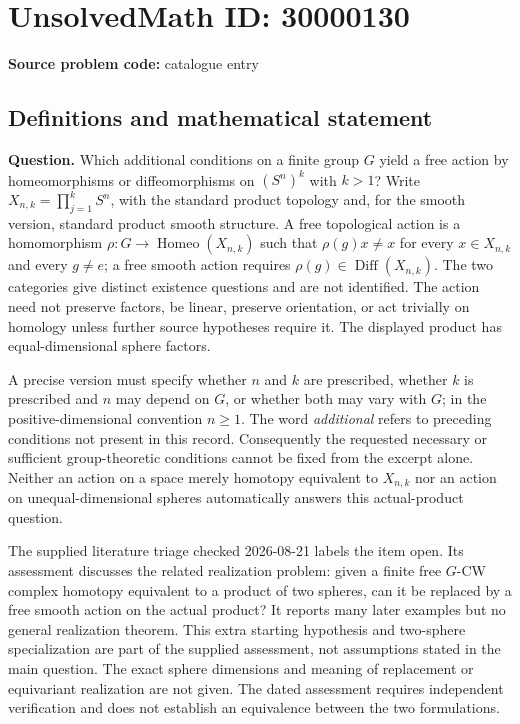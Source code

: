 \documentclass[11pt]{article}
\begin{document}
\section*{UnsolvedMath ID: 30000130}
\textbf{Source problem code:} catalogue entry
\subsection{Definitions and mathematical statement}
\textbf{Question.} Which additional conditions on a finite group \(G\) yield a free action by homeomorphisms or diffeomorphisms on \((S^n)^k\) with \(k>1\)? Write \(X_{n,k}=\prod_{j=1}^k S^n\), with the standard product topology and, for the smooth version, standard product smooth structure. A free topological action is a homomorphism \(\rho:G\to\operatorname{Homeo}(X_{n,k})\) such that \(\rho(g)x\ne x\) for every \(x\in X_{n,k}\) and every \(g\ne e\); a free smooth action requires \(\rho(g)\in\operatorname{Diff}(X_{n,k})\). The two categories give distinct existence questions and are not identified. The action need not preserve factors, be linear, preserve orientation, or act trivially on homology unless further source hypotheses require it. The displayed product has equal-dimensional sphere factors.\par A precise version must specify whether \(n\) and \(k\) are prescribed, whether \(k\) is prescribed and \(n\) may depend on \(G\), or whether both may vary with \(G\); in the positive-dimensional convention \(n\ge1\). The word \emph{additional} refers to preceding conditions not present in this record. Consequently the requested necessary or sufficient group-theoretic conditions cannot be fixed from the excerpt alone. Neither an action on a space merely homotopy equivalent to \(X_{n,k}\) nor an action on unequal-dimensional spheres automatically answers this actual-product question.\par The supplied literature triage checked 2026-08-21 labels the item open. Its assessment discusses the related realization problem: given a finite free \(G\)-CW complex homotopy equivalent to a product of two spheres, can it be replaced by a free smooth action on the actual product? It reports many later examples but no general realization theorem. This extra starting hypothesis and two-sphere specialization are part of the supplied assessment, not assumptions stated in the main question. The exact sphere dimensions and meaning of replacement or equivariant realization are not given. The dated assessment requires independent verification and does not establish an equivalence between the two formulations.
\end{document}
